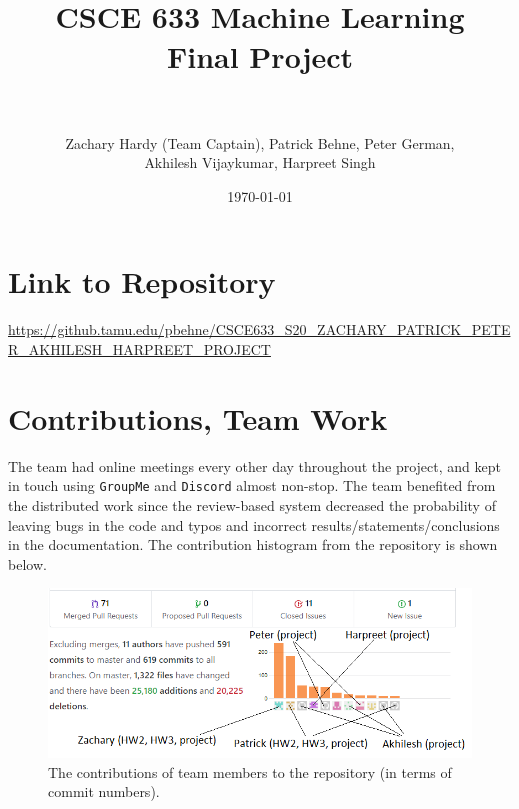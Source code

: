 \documentclass[paper=a4, fontsize=11pt]{scrartcl} %
\title{	
\normalfont \normalsize 
\horrule{0.5pt} \\[0.4cm] %
\LARGE CSCE 633 Machine Learning \\
\LARGE Final Project \\ %
\horrule{2pt} \\[0.5cm] %
}
\author{Zachary Hardy (Team Captain), Patrick Behne, Peter German, \\ Akhilesh Vijaykumar, Harpreet Singh} %
\date{\normalsize\today} %
\begin{document}
\maketitle %


\section*{Link to Repository}

\begin{center}
	\url{https://github.tamu.edu/pbehne/CSCE633_S20_ZACHARY_PATRICK_PETER_AKHILESH_HARPREET_PROJECT}
\end{center}

\section*{Contributions, Team Work} \label{sec:contributions}

The team had online meetings every other day throughout the project, and kept in touch using \texttt{GroupMe} and \texttt{Discord} almost non-stop.
The team benefited from the distributed work since the review-based system decreased the probability of leaving bugs in the code and typos and incorrect results/statements/conclusions in the documentation.
The contribution histogram from the repository is shown below. 
\begin{figure}[H]
	\centering
	\includegraphics[width=0.7\linewidth]{figures/contributions}
	\caption{The contributions of team members to the repository (in terms of commit numbers).}
	\label{fig:github_contrib}
\end{figure}
\end{document}
